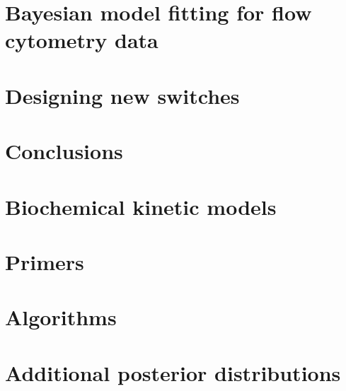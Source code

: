 \documentclass[]{phdthesis}
\begin{document}
\mainmatter*
\chapter{Bayesian model fitting for flow cytometry data}
\label{ch:Flow}

%
%

\mainmatter*
\chapter{Designing new switches}
\label{ch:desSw}


\mainmatter*
\chapter{Conclusions}
\label{ch:Conc}


\printbibliography 


\appendix
\chapter{Biochemical kinetic models}
\label{ap:ODEs}


\chapter{Primers}
\label{ap:Prim}


\chapter{Algorithms}
\label{ap:Alg}


\chapter{Additional posterior distributions}
\label{ap:figures}

\end{document}
